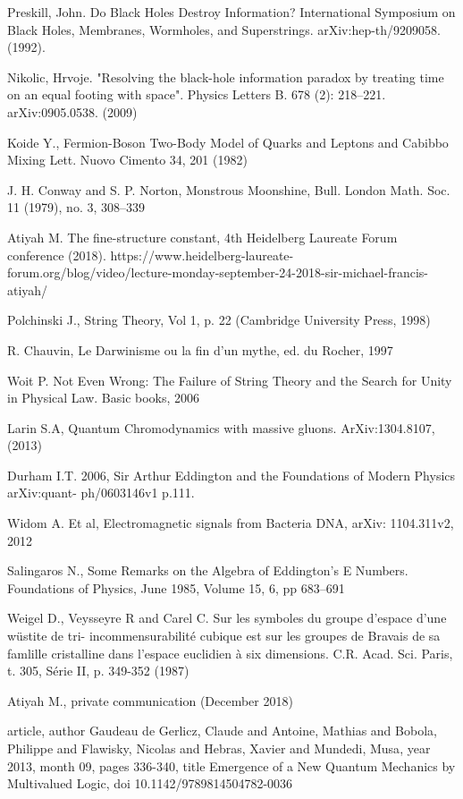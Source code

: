 \documentclass[twoside,draft]{article}
\begin{document}
{\begin{thebibliography}{99}
 Preskill, John. Do Black Holes Destroy Information? International Symposium on Black Holes,
Membranes, Wormholes, and Superstrings. arXiv:hep-th/9209058. (1992).

 Nikolic, Hrvoje. "Resolving the black-hole information paradox by treating time on an equal
footing with space". Physics Letters B. 678 (2): 218–221. arXiv:0905.0538. (2009)

 Koide Y., Fermion-Boson Two-Body Model of Quarks and Leptons and Cabibbo Mixing Lett.
Nuovo Cimento 34, 201 (1982)

 J. H. Conway and S. P. Norton, Monstrous Moonshine, Bull. London Math. Soc. 11 (1979), no.
3, 308–339

 Atiyah M. The fine-structure constant, 4th Heidelberg Laureate Forum conference (2018).
https://www.heidelberg-laureate-forum.org/blog/video/lecture-monday-september-24-2018-sir-michael-francis-atiyah/

 Polchinski J., String Theory, Vol 1, p. 22 (Cambridge University Press, 1998)

 R. Chauvin, Le Darwinisme ou la fin d'un mythe, ed. du Rocher, 1997

 Woit P. Not Even Wrong: The Failure of String Theory and the Search for Unity in Physical
Law. Basic books, 2006

 Larin S.A, Quantum Chromodynamics with massive gluons. ArXiv:1304.8107, (2013)

 Durham I.T. 2006, Sir Arthur Eddington and the Foundations of Modern Physics arXiv:quant-
ph/0603146v1 p.111.

 Widom A. Et al, Electromagnetic signals from Bacteria DNA, arXiv: 1104.311v2, 2012

 Salingaros N., Some Remarks on the Algebra of Eddington's E Numbers. Foundations of
Physics, June 1985, Volume 15, 6, pp 683–691

 Weigel D., Veysseyre R and Carel C. Sur les symboles du groupe d'espace d'une wüstite de tri-
incommensurabilité cubique est sur les groupes de Bravais de sa famlille cristalline dans
l'espace euclidien à six dimensions. C.R. Acad. Sci. Paris, t. 305, Série II, p. 349-352 (1987)

 Atiyah M., private communication (December 2018)

 {article,
author {Gaudeau de Gerlicz, Claude and Antoine, Mathias and Bobola, Philippe and Flawisky, Nicolas and Hebras, Xavier and Mundedi, Musa},
year {2013},
month {09},
pages {336-340},
title {Emergence of a New Quantum Mechanics by Multivalued Logic},
doi {10.1142/9789814504782-0036}
}


\end{thebibliography}}
\end{document}
